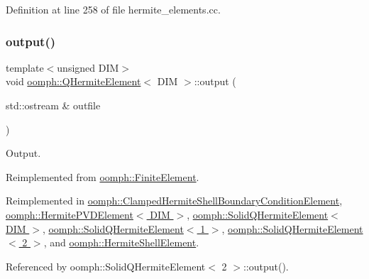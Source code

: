 Definition at line 258 of file hermite\+\_\+elements.\+cc.

\mbox{\label{classoomph_1_1QHermiteElement_aed2b691a0b8effb35840561b5112a3af}} 
\subsubsection{\texorpdfstring{output()}{output()}\hspace{0.1cm}{\footnotesize\ttfamily [5/12]}}
{\footnotesize\ttfamily template$<$unsigned D\+IM$>$ \\
void \hyperlink{classoomph_1_1QHermiteElement}{oomph\+::\+Q\+Hermite\+Element}$<$ D\+IM $>$\+::output (\begin{DoxyParamCaption}\item[{std\+::ostream \&}]{outfile }\end{DoxyParamCaption})\hspace{0.3cm}{\ttfamily [virtual]}}



Output. 



Reimplemented from \hyperlink{classoomph_1_1FiniteElement_a2ad98a3d2ef4999f1bef62c0ff13f2a7}{oomph\+::\+Finite\+Element}.



Reimplemented in \hyperlink{classoomph_1_1ClampedHermiteShellBoundaryConditionElement_a1595e604991ff18f4d907da5a8fdf40b}{oomph\+::\+Clamped\+Hermite\+Shell\+Boundary\+Condition\+Element}, \hyperlink{classoomph_1_1HermitePVDElement_aa0e10a14a3b005e07d74c9fa99e47d48}{oomph\+::\+Hermite\+P\+V\+D\+Element$<$ D\+I\+M $>$}, \hyperlink{classoomph_1_1SolidQHermiteElement_a6459f239b585ae575d779f58f70bae46}{oomph\+::\+Solid\+Q\+Hermite\+Element$<$ D\+I\+M $>$}, \hyperlink{classoomph_1_1SolidQHermiteElement_a6459f239b585ae575d779f58f70bae46}{oomph\+::\+Solid\+Q\+Hermite\+Element$<$ 1 $>$}, \hyperlink{classoomph_1_1SolidQHermiteElement_a6459f239b585ae575d779f58f70bae46}{oomph\+::\+Solid\+Q\+Hermite\+Element$<$ 2 $>$}, and \hyperlink{classoomph_1_1HermiteShellElement_af2313040b66727088dc044738b652677}{oomph\+::\+Hermite\+Shell\+Element}.



Referenced by oomph\+::\+Solid\+Q\+Hermite\+Element$<$ 2 $>$\+::output().

